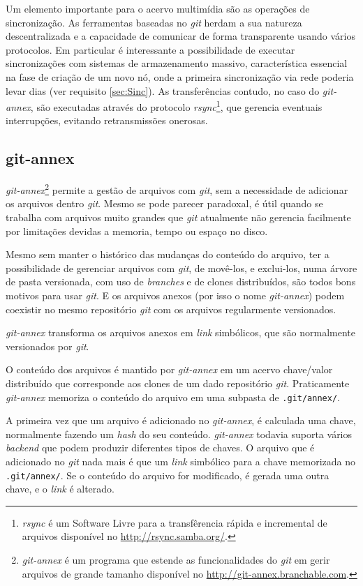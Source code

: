 Um elemento importante para o acervo multimídia são as operações de
sincronização. As ferramentas baseadas no \emph{git} herdam a sua
natureza descentralizada e a capacidade de comunicar de forma
transparente usando vários protocolos. Em particular é interessante a
possibilidade de executar sincronizações com sistemas de armazenamento
massivo, característica essencial na fase de criação de um novo nó,
onde a primeira sincronização via rede poderia levar dias (ver
requisito \ref{sec:Sinc}). As transferências contudo, no caso
do \emph{git-annex}, são executadas através do protocolo
\emph{rsync}\footnote{\emph{rsync} é um Software Livre para a
  transfêrencia rápida e incremental de arquivos disponível no
  \url{http://rsync.samba.org/}.}, que gerencia eventuais
interrupções, evitando retransmissões onerosas. 

\subsection{git-annex}\label{git-annex}
\emph{git-annex}\footnote{\emph{git-annex} é um programa que estende
  as funcionalidades do \emph{git} em gerir arquivos de grande tamanho
disponível no \url{http://git-annex.branchable.com}.} permite a
gestão de arquivos com \emph{git}, sem a necessidade de adicionar os
arquivos dentro \emph{git}. Mesmo se pode parecer paradoxal, é útil
quando se trabalha com arquivos muito grandes que \emph{git}
atualmente não gerencia facilmente por limitações devidas a memoria,
tempo ou espaço no disco.

Mesmo sem manter o histórico das mudanças do conteúdo do arquivo, ter
a possibilidade de gerenciar arquivos com \emph{git}, de movê-los, e
exclui-los, numa árvore de pasta versionada, com uso de
\emph{branches} e de clones distribuídos, são todos bons motivos para
usar \emph{git}. E os arquivos anexos (por isso o nome
\emph{git-annex}) podem coexistir no mesmo repositório \emph{git} com
os arquivos regularmente versionados. 

\emph{git-annex} transforma os arquivos anexos em \emph{link}
simbólicos, que são normalmente versionados por \emph{git}. 

O conteúdo dos arquivos é mantido por \emph{git-annex} em um acervo
chave/valor distribuído que corresponde aos clones de um dado
repositório \emph{git}. Praticamente \emph{git-annex} memoriza o
conteúdo do arquivo em uma subpasta de \verb|.git/annex/|.

A primeira vez que um arquivo é adicionado no \emph{git-annex}, é
calculada uma chave, normalmente fazendo um \emph{hash} do seu
conteúdo. \emph{git-annex} todavia suporta vários \emph{backend} que
podem produzir diferentes tipos de chaves. O arquivo que é adicionado
no \emph{git} nada mais é que um \emph{link} simbólico para a chave
memorizada no \verb|.git/annex/|. Se o conteúdo do arquivo for
modificado, é gerada uma outra chave, e o \emph{link} é alterado. 

